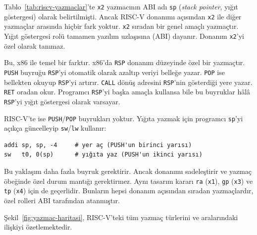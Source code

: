 \begin{bilginot}
Tablo~\ref{tab:riscv-yazmaclar}'te \texttt{x2} yazmacının ABI adı \texttt{sp} (\emph{stack pointer}, yığıt göstergesi) olarak belirtilmişti. Ancak RISC-V donanımı açısından \texttt{x2} ile diğer yazmaçlar arasında hiçbir fark yoktur. \texttt{x2} sıradan bir genel amaçlı yazmaçtır. Yığıt göstergesi rolü tamamen yazılım uzlaşısına (ABI) dayanır. Donanım \texttt{x2}'yi özel olarak tanımaz.

Bu, x86 ile temel bir farktır. x86'da \texttt{RSP} donanım düzeyinde özel bir yazmaçtır. \texttt{PUSH} buyruğu \texttt{RSP}'yi otomatik olarak azaltıp veriyi belleğe yazar. \texttt{POP} ise bellekten okuyup \texttt{RSP}'yi artırır. \texttt{CALL} dönüş adresini \texttt{RSP}'nin gösterdiği yere yazar. \texttt{RET} oradan okur. Programcı \texttt{RSP}'yi başka amaçla kullansa bile bu buyruklar hâlâ \texttt{RSP}'yi yığıt göstergesi olarak varsayar.

RISC-V'te ise \texttt{PUSH}/\texttt{POP} buyrukları yoktur. Yığıta yazmak için programcı \texttt{sp}'yi açıkça güncelleyip \texttt{sw}/\texttt{lw} kullanır:
\begin{lstlisting}[style=riscv]
addi sp, sp, -4     # yer aç (PUSH'un birinci yarısı)
sw   t0, 0(sp)      # yığıta yaz (PUSH'un ikinci yarısı)
\end{lstlisting}
Bu yaklaşım daha fazla buyruk gerektirir. Ancak donanımı sadeleştirir ve yazmaç öbeğinde özel durum mantığı gerektirmez. Aynı tasarım kararı \texttt{ra} (\texttt{x1}), \texttt{gp} (\texttt{x3}) ve \texttt{tp} (\texttt{x4}) için de geçerlidir. Bunların hepsi donanım açısından sıradan yazmaçlardır, özel rolleri ABI tarafından atanmıştır.
\end{bilginot}

Şekil~\ref{fig:yazmac-haritasi}, RISC-V'teki tüm yazmaç türlerini ve aralarındaki ilişkiyi özetlemektedir.

